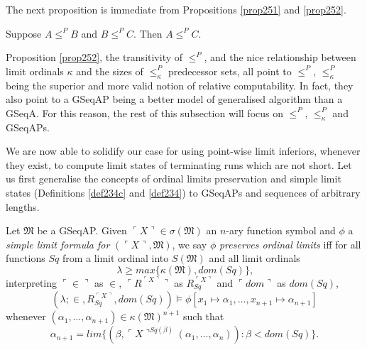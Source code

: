 \documentclass[12pt]{article}
\numberwithin{equation}{section}
\begin{document}
The next proposition is immediate from Propositions \ref{prop251} and \ref{prop252}.

\begin{prop}
Suppose $A \leq^P B$ and $B \leq^P C$. Then $A \leq^P C$.
\end{prop} 

Proposition \ref{prop252}, the transitivity of $\leq^P$, and the nice relationship between limit ordinals $\kappa$ and the sizes of $\leq^P_{\kappa}$ predecessor sets, all point to $\leq^P$, $\leq^P_{\kappa}$ being the superior and more valid notion of relative computability. In fact, they also point to a GSeqAP being a better model of generalised algorithm than a GSeqA. For this reason, the rest of this subsection will focus on $\leq^P$, $\leq^P_{\kappa}$ and GSeqAPs.

We are now able to solidify our case for using point-wise limit inferiors, whenever they exist, to compute limit states of terminating runs which are not short. Let us first generalise the concepts of ordinal limits preservation and simple limit states (Definitions \ref{def234c} and \ref{def234}) to GSeqAPs and sequences of arbitrary lengths.

\begin{defi}\label{257c}
Let $\mathfrak{M}$ be a GSeqAP. Given $\ulcorner X \urcorner \in \sigma(\mathfrak{M})$ an $n$-ary function symbol and $\phi$ a \emph{simple limit formula for} $(\ulcorner X \urcorner, \mathfrak{M})$, we say $\phi$ \emph{preserves ordinal limits} iff for all functions $Sq$ from a limit ordinal into $S(\mathfrak{M})$ and all limit ordinals 
\begin{equation*}
    \lambda \geq max\{\kappa(\mathfrak{M}), dom(Sq)\} \text{,}
\end{equation*}
interpreting $\ulcorner \in \urcorner$ as $\in$, $\ulcorner R^{\ulcorner X \urcorner} \urcorner$ as $R_{Sq}^{\ulcorner X \urcorner}$ and $\ulcorner dom \urcorner$ as $dom(Sq)$, 
\begin{equation*}
    (\lambda; \in, R_{Sq}^{\ulcorner X \urcorner}, dom(Sq)) \models \phi[x_1 \mapsto \alpha_1, \dots, x_{n+1} \mapsto \alpha_{n+1}]
\end{equation*}
whenever $(\alpha_1, \dots, \alpha_{n+1}) \in \kappa(\mathfrak{M})^{n+1}$ such that 
\begin{equation*}
    \alpha_{n+1} = lim \{(\beta, \ulcorner X \urcorner^{Sq(\beta)}(\alpha_1, \dots, \alpha_n)) : \beta < dom(Sq)\} \text{.}
\end{equation*}
\end{defi}
\end{document}
